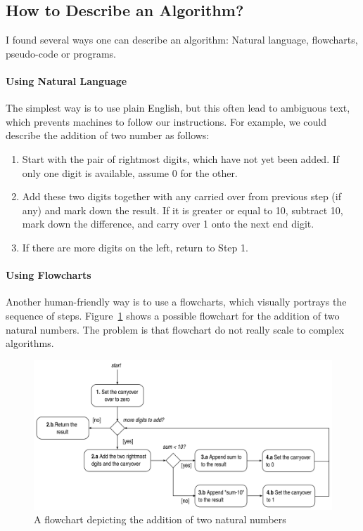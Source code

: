 \documentclass {aldast}
\begin{document}
\subsection{How to Describe an Algorithm?}

I found several ways one can describe an algorithm: Natural language,
flowcharts, pseudo-code or programs.

\paragraph{Using Natural Language} The simplest way is to use plain
English, but this often lead to ambiguous text, which prevents
machines to follow our instructions. For example, we could describe
the addition of two number as follows:
\begin{enumerate}
\item Start with the pair of rightmost digits, which have not yet
    been added. If only one digit is available, assume 0 for the
    other.
  \item Add these two digits together with any carried over from
    previous step (if any) and mark down the result. If it is greater
    or equal to 10, subtract 10, mark down the difference, and carry
    over 1 onto the next end digit.
  \item If there are more digits on the left, return to Step 1.
\end{enumerate}

\paragraph{Using Flowcharts} Another human-friendly way is to use a
flowcharts, which visually portrays the sequence of
steps. Figure~\ref{fig:flowchart} shows a possible flowchart for the
addition of two natural numbers. The problem is that flowchart do not
really scale to complex algorithms.

\begin{figure}[htbp]
  \begin{center}
    \includegraphics[width=\textwidth]{images/flowchart}
  \end{center}
  \caption{A flowchart depicting the addition of two natural numbers}
  \label{fig:flowchart}
\end{figure}
\end{document}
